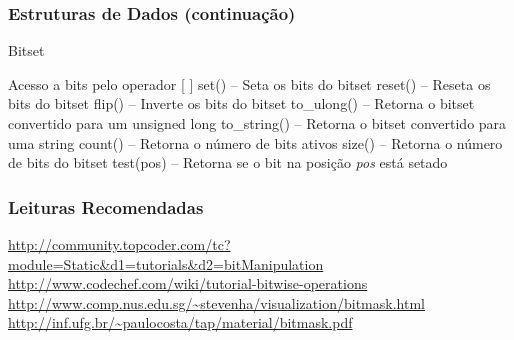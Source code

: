 \begin{frame}
\frametitle{Estruturas de Dados (continuação)}
\begin{block}{Bitset}
\begin{itemize}
	\bitem Acesso a bits pelo operador [ ]
	\bitem set() -- Seta os bits do bitset
	\bitem reset() -- Reseta os bits do bitset
	\bitem flip() -- Inverte os bits do bitset
	\bitem to\_ulong() -- Retorna o bitset convertido para um unsigned long
	\bitem to\_string() -- Retorna o bitset convertido para uma string
	\bitem count() -- Retorna o número de bits ativos
	\bitem size() -- Retorna o número de bits do bitset
	\bitem test(pos) -- Retorna se o bit na posição \textit{pos} está setado
\end{itemize}
\end{block}
\end{frame}
\begin{frame}
\frametitle{Leituras Recomendadas}

\begin{block}{}
\begin{itemize}
\tiny
	\bitem \url{http://community.topcoder.com/tc?module=Static&d1=tutorials&d2=bitManipulation}
	\bitem \url{http://www.codechef.com/wiki/tutorial-bitwise-operations}
	\bitem \url{http://www.comp.nus.edu.sg/~stevenha/visualization/bitmask.html}
	\bitem \url{http://inf.ufg.br/~paulocosta/tap/material/bitmask.pdf}
\end{itemize}
\end{block}

\end{frame}

